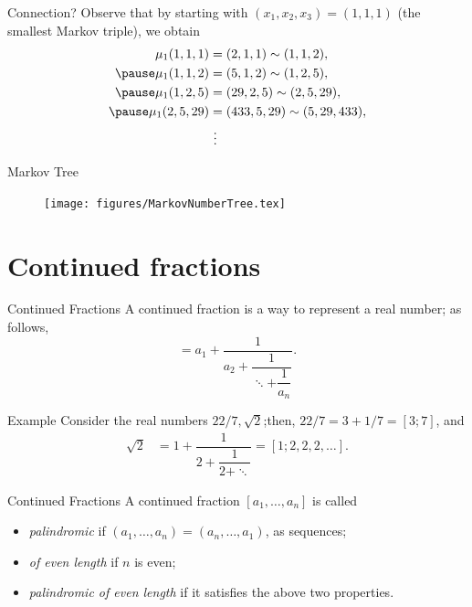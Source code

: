 \documentclass{beamer}
\begin{document}
\begin{frame}{Connection?}
    Observe that by starting with $(x_1,x_2,x_3) = (1,1,1)$ (the smallest Markov triple), we obtain \pause
    \begin{align*}
    \mu_1(1,1,1) &= (2,1,1) \sim (1,1,2), \\ \pause
    \mu_1(1,1,2) &= (5,1,2) \sim (1,2,5), \\ \pause
    \mu_1(1,2,5) &= (29,2,5) \sim (2,5,29), \\ \pause
    \mu_1(2,5,29) &= (433,5,29) \sim (5,29,433), \\
    & \ \vdots
\end{align*}
\end{frame}

\begin{frame}{Markov Tree}
\begin{figure}
    \centering
    \texttt{[image: figures/MarkovNumberTree.tex]}
\end{figure}    
\end{frame}

\section{Continued fractions}

\begin{frame}{Continued Fractions}
A continued fraction is a way to represent a real number; as follows, \pausa
\begin{equation*}
    [a_1,a_2,\dots,a_n] = a_1 + \dfrac{1}{a_2+\dfrac{1}{\ddots + \dfrac{1}{a_n}}}.
\end{equation*}
\pause
\begin{exampleblock}{Example}
    Consider the real numbers $22/7,\sqrt{2}$;\pause  then, $22/7 = 3+1/7 = [3;7]$, and 
    \pause
\begin{align*}
    \sqrt{2} &= 1 + \dfrac{1}{2+ \dfrac{1}{2 + \ddots}} = [1;2,2,2,\dots].
\end{align*} 
\end{exampleblock}
\end{frame}


\begin{frame}{Continued Fractions}
    A continued fraction $[a_1,\dots,a_n]$ is called \pause
    \begin{itemize}
        \item \emph{palindromic} if $(a_1,\dots,a_n) = (a_n,\dots,a_1)$, as sequences; \pause
        \item \emph{of even length} if $n$ is even;\pause
        \item \emph{palindromic of even length} if it satisfies the above two properties.
    \end{itemize}
\end{frame}
\end{document}
